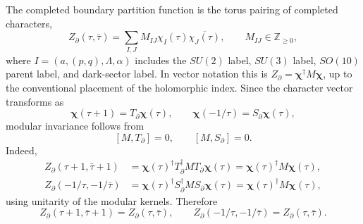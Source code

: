 \documentclass[11pt,letterpaper]{article}
\theoremstyle{plain}
\newcommand{\Zboundary}{Z_{\partial}}
\begin{document}
The completed boundary partition function is the torus pairing of completed
characters,
\begin{equation}
\label{eq:section-three-zboundary-completed}
 \Zboundary(\tau,\bar\tau)
 =
 \sum_{I,J}M_{IJ}\chi_I(\tau)\overline{\chi_J(\tau)},
 \qquad
 M_{IJ}\in\mathbb Z_{\ge0},
\end{equation}
where
$I=(a,(p,q),\Lambda,\alpha)$ includes the $SU(2)$ label, $SU(3)$ label,
$SO(10)$ parent label, and dark-sector label.  In vector notation this is
$\Zboundary=\boldsymbol\chi^{\dagger}M\boldsymbol\chi$, up to the conventional
placement of the holomorphic index.  Since the character vector transforms as
\begin{equation}
\label{eq:section-three-character-transform}
 \boldsymbol\chi(\tau+1)=T_{\partial}\boldsymbol\chi(\tau),
 \qquad
 \boldsymbol\chi(-1/\tau)=S_{\partial}\boldsymbol\chi(\tau),
\end{equation}
modular invariance follows from
\begin{equation}
\label{eq:section-three-commuting-m}
 [M,T_{\partial}]=0,
 \qquad
 [M,S_{\partial}]=0.
\end{equation}
Indeed,
\begin{align}
\label{eq:section-three-t-invariance-derivation}
 \Zboundary(\tau+1,\bar\tau+1)
 &=
 \boldsymbol\chi(\tau)^{\dagger}
 T_{\partial}^{\dagger}MT_{\partial}
 \boldsymbol\chi(\tau)
 =
 \boldsymbol\chi(\tau)^{\dagger}M\boldsymbol\chi(\tau),\\
\label{eq:section-three-s-invariance-derivation}
 \Zboundary(-1/\tau,-1/\bar\tau)
 &=
 \boldsymbol\chi(\tau)^{\dagger}
 S_{\partial}^{\dagger}MS_{\partial}
 \boldsymbol\chi(\tau)
 =
 \boldsymbol\chi(\tau)^{\dagger}M\boldsymbol\chi(\tau),
\end{align}
using unitarity of the modular kernels.  Therefore
\begin{equation}
\label{eq:section-three-z-modular-invariance}
 \boxed{
 \Zboundary(\tau+1,\bar\tau+1)=\Zboundary(\tau,\bar\tau),
 \qquad
 \Zboundary(-1/\tau,-1/\bar\tau)=\Zboundary(\tau,\bar\tau).}
\end{equation}
\end{document}
